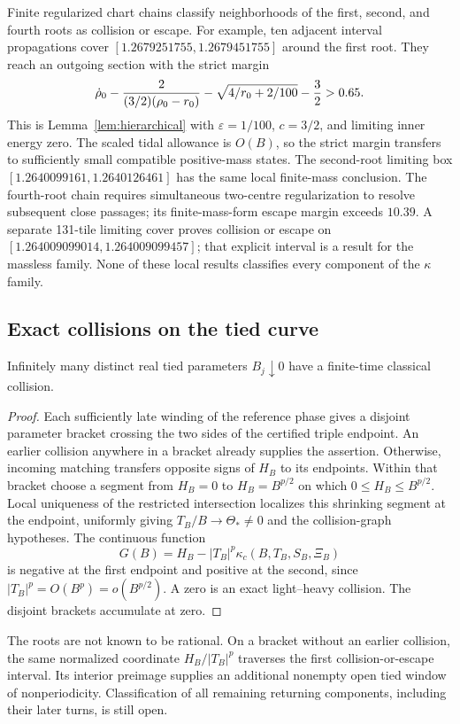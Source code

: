 Finite regularized chart chains classify neighborhoods of the first,
second, and fourth roots as collision or escape. For example, ten adjacent
interval propagations cover
$[1.2679251755,1.2679451755]$ around the first root. They reach an
outgoing section with the strict margin
\[
 \dot\rho_0-{2\over(3/2)(\rho_0-r_0)}
 -\sqrt{4/r_0+2/100}-{3\over2}>0.65.
\]
This is Lemma~\ref{lem:hierarchical} with
$\varepsilon=1/100$, $c=3/2$, and limiting inner energy zero.
The scaled tidal allowance is $O(B)$, so the strict margin transfers to
sufficiently small compatible positive-mass states. The second-root
limiting box $[1.2640099161,1.2640126461]$ has the same local
finite-mass conclusion. The fourth-root chain requires simultaneous
two-centre regularization to resolve subsequent close passages; its
finite-mass-form escape margin exceeds $10.39$. A separate 131-tile
limiting cover proves collision or escape on
$[1.264009099014,1.264009099457]$; that explicit interval is a result
for the massless family. None of these local results classifies every
component of the $\kappa$ family.

\subsection{Exact collisions on the tied curve}

\begin{theorem}
Infinitely many distinct real tied parameters $B_j\downarrow0$ have a
finite-time classical collision.
\end{theorem}
\begin{proof}
Each sufficiently late winding of the reference phase gives a disjoint
parameter bracket crossing the two sides of the certified triple endpoint.
An earlier collision anywhere in a bracket already supplies the assertion.
Otherwise, incoming matching transfers opposite signs of $H_B$ to its
endpoints. Within that bracket choose a segment from $H_B=0$ to
$H_B=B^{p/2}$ on which $0\le H_B\le B^{p/2}$. Local uniqueness of the
restricted intersection localizes this shrinking segment at the endpoint,
uniformly giving $T_B/B\to\Theta_*\ne0$ and the collision-graph
hypotheses. The continuous function
\[
 G(B)=H_B-|T_B|^p\kappa_c(B,T_B,S_B,\Xi_B)
\]
is negative at the first endpoint and positive at the second, since
$|T_B|^p=O(B^p)=o(B^{p/2})$. A zero is an exact light--heavy collision.
The disjoint brackets accumulate at zero.
\end{proof}
The roots are not known to be rational. On a bracket without an earlier
collision, the same normalized coordinate $H_B/|T_B|^p$ traverses the
first collision-or-escape interval. Its interior preimage supplies an
additional nonempty open tied window of nonperiodicity. Classification
of all remaining returning components, including their later turns,
is still open.
